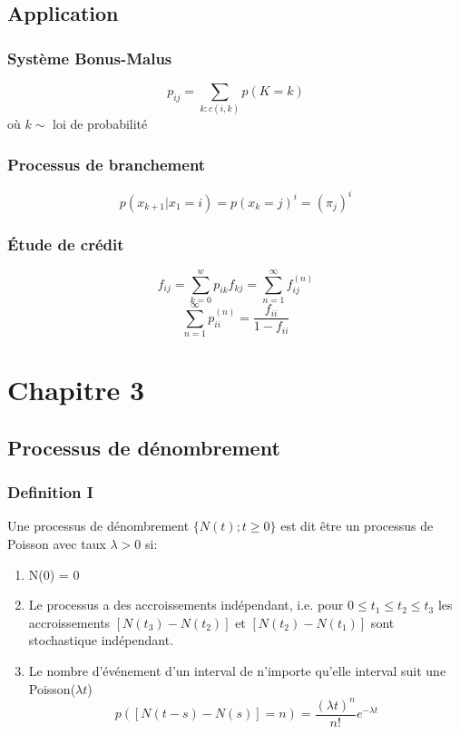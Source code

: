 \documentclass[13pt]{article}
\begin{document}
\subsection*{Application}

\subsubsection*{Système Bonus-Malus}
\[ p_{ij} = \sum_{k:c(i,k)} p(K = k) \] 
où $k \sim$ loi de probabilité 

\subsubsection*{Processus de branchement}
\[ p(x_{k+1}|x_1 = i) = p(x_k = j)^i = (\pi_j)^i \]


\subsubsection*{Étude de crédit}

\[ f_{ij} = \sum_{k=0}^w p_{ik} f_{kj} = \sum_{n=1}^\infty f_{ij}^{(n)} \]
\[ \sum_{n=1}^\infty p_{ii}^{(n)} = \frac{f_{ii}}{1 - f_{ii}} \]

\section*{Chapitre 3}
\subsection*{Processus de dénombrement}
\subsubsection*{Definition I}
Une processus de dénombrement $\{ N(t);t \geq 0 \}$ est dit être un processus de Poisson avec taux $\lambda > 0$ si:
\begin{enumerate}
  \item N(0) = 0
  \item Le processus a des accroissements indépendant, i.e. pour $0 \leq t_1 \leq t_2 \leq t_3$ les accroissements $[N(t_3) - N(t_2)]$ et $[N(t_2) - N(t_1)]$ 
        sont stochastique indépendant.
  \item Le nombre d'événement d'un interval de n'importe qu'elle interval suit une Poisson($\lambda t$)
        \[ p([N(t-s) - N(s)] = n) = \frac{(\lambda t)^n}{n!} e^{-\lambda t} \]
\end{enumerate}
\end{document}
